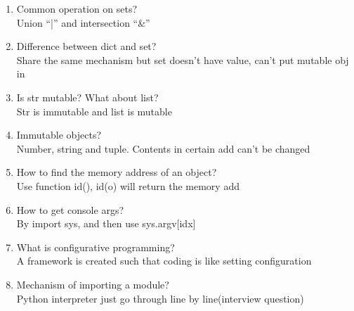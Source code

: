 \documentclass[10pt,a4paper,oneside]{article}
\begin{document}
\begin{enumerate}
	\item Common operation on sets?\\
	Union ``|'' and intersection ``\&''
	\item Difference between dict and set?\\
	Share the same mechanism but set doesn’t have value, can't put mutable obj in
	\item Is str mutable? What about list?\\
	Str is immutable and list is mutable
	\item Immutable objects?\\
	Number, string and tuple. Contents in certain add can't be changed
	\item How to find the memory address of an object?\\
	Use function id(), id(o) will return the memory add
	\item How to get console args?\\
	By import sys, and then use sys.argv[idx]
	\item What is configurative programming?\\
	A framework is created such that coding is like setting configuration
	\item Mechanism of importing a module? \\
	Python interpreter just go through line by line(interview question)
\end{enumerate}
\end{document}
